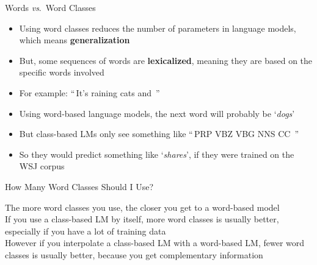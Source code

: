 \documentclass[xcolor=pdftex,x11names,table,hyperref]{beamer}
\begin{document}
\begin{frame}{Words \textit{vs}.\ Word Classes}
\begin{itemize}
	\item Using word classes reduces the number of parameters in language models, which means \textbf{generalization}
	\pause
	\item But, some sequences of words are \textbf{lexicalized}, meaning they are based on the specific words involved
	\pause
	\item For example:   ``\,It's raining cats and \underline{\hspace{2em}}\,''
	\pause
	\item Using word-based language models, the next word will probably be `\textit{dogs}'
	\pause
	\item But class-based LMs only see something like ``\,PRP VBZ VBG NNS CC \underline{\hspace{2em}}\,''
	\item So they would predict something like `\textit{shares}', if they were trained on the WSJ corpus
\end{itemize}
\end{frame}

  \makeatletter
\newcommand{\myLines}[1]{
  \begin{picture}(2,1)
    \dashline{0.2}(-0.09375,0)(0.89615,1)
    \put(1.89625,0){\line(-1,1){1}}
\end{picture}}
\let\qdrawReal=\qdraw@branches
\newcommand\brOverride{\let\qdraw@branches=\myLines}
\newcommand\brRestore{\let\qdraw@branches=\qdrawReal}
\makeatother

\makeatletter
\newcommand{\myLine}[1]{
  \begin{picture}(0,1)
    \dashline{0.4}(-0.25,0)(-0.25,1)
\end{picture}}
\let\qdrawReal=\qdraw@branches
\newcommand\sbrOverride{\let\qdraw@branches=\myLine}
\newcommand\sbrRestore{\let\qdraw@branches=\qdrawReal}
\makeatother



\begin{frame}{How Many Word Classes Should I Use?}
	\begin{large}
	The more word classes you use, the closer you get to a word-based model \\[1.0em]

	\pause
	If you use a class-based LM by itself, more word classes is usually better, especially if you have a lot of training data \\[1.0em]

	\pause
	However if you interpolate a class-based LM with a word-based LM, fewer word classes is usually better, because you get complementary information
	\end{large}
\end{frame}
\end{document}

